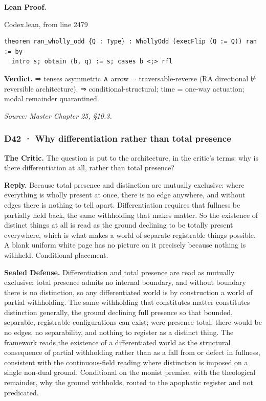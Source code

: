 \documentclass[10pt,twocolumn]{article}
\begin{document}
\textbf{Lean Proof.}

\begin{leanexcerpt}{Codex.lean, from line 2479}
\begin{lstlisting}[style=leanx,firstnumber=2479]
theorem ran_wholly_odd {Q : Type} : WhollyOdd (execFlip (Q := Q)) ran := by
  intro s; obtain ⟨b, q⟩ := s; cases b <;> rfl
\end{lstlisting}
\end{leanexcerpt}

\textbf{Verdict.} ⇒ tenses asymmetric ∧ arrow ¬ traversable-reverse (RA
directional ⊬ reversible architecture). ⇒ conditional-structural; time =
one-way actuation; modal remainder quarantined.

\emph{Source: Master Chapter 25, §10.3.}

\hypertarget{d42-why-differentiation-rather-than-total-presence}{%
\subsubsection{D42 · Why differentiation rather than total
presence}\label{d42-why-differentiation-rather-than-total-presence}}

\textbf{The Critic.} The question is put to the architecture, in the
critic's terms: why is there differentiation at all, rather than total
presence?

\textbf{Reply.} Because total presence and distinction are mutually
exclusive: where everything is wholly present at once, there is no edge
anywhere, and without edges there is nothing to tell apart.
Differentiation requires that fullness be partially held back, the same
withholding that makes matter. So the existence of distinct things at
all is read as the ground declining to be totally present everywhere,
which is what makes a world of separate registrable things possible. A
blank uniform white page has no picture on it precisely because nothing
is withheld. Conditional placement.

\textbf{Sealed Defense.} Differentiation and total presence are read as
mutually exclusive: total presence admits no internal boundary, and
without boundary there is no distinction, so any differentiated world is
by construction a world of partial withholding. The same withholding
that constitutes matter constitutes distinction generally, the ground
declining full presence so that bounded, separable, registrable
configurations can exist; were presence total, there would be no edges,
no separability, and nothing to register as a distinct thing. The
framework reads the existence of a differentiated world as the
structural consequence of partial withholding rather than as a fall from
or defect in fullness, consistent with the continuous-field reading
where distinction is imposed on a single non-dual ground. Conditional on
the monist premise, with the theological remainder, why the ground
withholds, routed to the apophatic register and not predicated.
\end{document}
